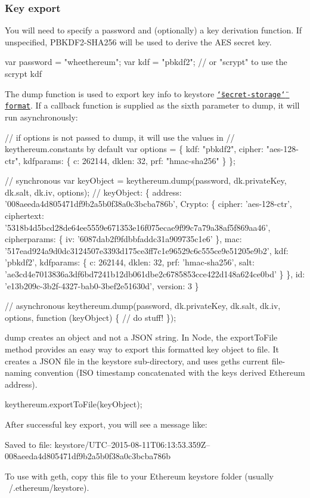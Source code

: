 \subsubsection*{Key export}

You will need to specify a password and (optionally) a key derivation function. If unspecified, P\+B\+K\+D\+F2-\/\+S\+H\+A256 will be used to derive the A\+ES secret key. 
\begin{DoxyCode}
var password = "wheethereum";
var kdf = "pbkdf2"; // or "scrypt" to use the scrypt kdf
\end{DoxyCode}
 The {\ttfamily dump} function is used to export key info to keystore \href{https://github.com/ethereum/wiki/wiki/Web3-Secret-Storage-Definition}{\tt \char`\"{}secret-\/storage\char`\"{} format}. If a callback function is supplied as the sixth parameter to {\ttfamily dump}, it will run asynchronously\+: 
\begin{DoxyCode}
// if options is not passed to dump, it will use the values in
// keythereum.constants by default
var options = \{
    kdf: "pbkdf2",
    cipher: "aes-128-ctr",
    kdfparams: \{
        c: 262144,
        dklen: 32,
        prf: "hmac-sha256"
    \}
\};

// synchronous
var keyObject = keythereum.dump(password, dk.privateKey, dk.salt, dk.iv, options);
// keyObject:
\{
    address: '008aeeda4d805471df9b2a5b0f38a0c3bcba786b',
    Crypto: \{
        cipher: 'aes-128-ctr',
        ciphertext: '5318b4d5bcd28de64ee5559e671353e16f075ecae9f99c7a79a38af5f869aa46',
        cipherparams: \{
            iv: '6087dab2f9fdbbfaddc31a909735c1e6'
        \},
        mac: '517ead924a9d0dc3124507e3393d175ce3ff7c1e96529c6c555ce9e51205e9b2',
        kdf: 'pbkdf2',
        kdfparams: \{
            c: 262144,
            dklen: 32,
            prf: 'hmac-sha256',
            salt: 'ae3cd4e7013836a3df6bd7241b12db061dbe2c6785853cce422d148a624ce0bd'
        \}
    \},
    id: 'e13b209c-3b2f-4327-bab0-3bef2e51630d',
    version: 3
\}

// asynchronous
keythereum.dump(password, dk.privateKey, dk.salt, dk.iv, options, function (keyObject) \{
    // do stuff!
\});
\end{DoxyCode}
 {\ttfamily dump} creates an object and not a J\+S\+ON string. In Node, the {\ttfamily export\+To\+File} method provides an easy way to export this formatted key object to file. It creates a J\+S\+ON file in the {\ttfamily keystore} sub-\/directory, and uses geth\textquotesingle{}s current file-\/naming convention (I\+SO timestamp concatenated with the key\textquotesingle{}s derived Ethereum address). 
\begin{DoxyCode}
keythereum.exportToFile(keyObject);
\end{DoxyCode}
 After successful key export, you will see a message like\+: 
\begin{DoxyCode}
Saved to file:
keystore/UTC--2015-08-11T06:13:53.359Z--008aeeda4d805471df9b2a5b0f38a0c3bcba786b

To use with geth, copy this file to your Ethereum keystore folder
(usually ~/.ethereum/keystore).
\end{DoxyCode}


